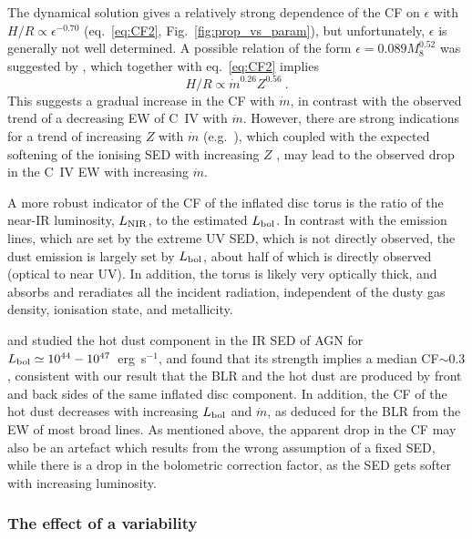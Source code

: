 \documentclass[a4paper,fleqn,usenatbib]{mnras}
\begin{document}
The dynamical solution gives a relatively strong dependence of the CF on $\epsilon$
with $H/R\propto \epsilon^{-0.70}$ (eq.~\ref{eq:CF2}, Fig.~\ref{fig:prop_vs_param}), but 
unfortunately, $\epsilon$ is generally not well determined. A possible relation of the form 
$\epsilon=0.089M_8^{0.52}$ was suggested by \citet{DavisLaor11}, which together with eq.~\ref{eq:CF2}
implies
\begin{equation}
H/R\propto \dot{m}^{0.26}Z^{0.56}\ .
\label{eq:cf_mdot}  
\end{equation}
This suggests a gradual increase in the CF with $\dot{m}$, in contrast with the observed trend of a
decreasing EW of C~IV with $\dot{m}$. However, there are strong indications for a trend of increasing $Z$
with $\dot{m}$ (e.g.\ \citealt{Shemmer04}), which coupled with the expected softening of the ionising
SED with increasing $Z$ \citep{LaorDavis14}, may lead to the observed drop in the C~IV EW with increasing
$\dot{m}$.

A more robust indicator of the CF of the inflated disc torus is the ratio of the near-IR
luminosity, $L_{\rm NIR}$, to the estimated $L_{\rm bol}$. In contrast with the emission lines, which 
are set by the extreme UV SED, which is not directly observed, the dust emission is largely set by
$L_{\rm bol}$, about half of which
is directly observed (optical to near UV). In addition,
the torus is likely very optically thick, and absorbs and reradiates all the incident radiation,
independent of the dusty gas density, ionisation state, and metallicity. 

\citet{Mor11} and \citet{Mor12} studied the hot dust component in the IR SED of AGN for
$L_{\rm bol}\simeq 10^{44}-10^{47}$~erg~s$^{-1}$, and found that its strength implies a median 
CF$\sim 0.3$, consistent with our result that the BLR and the hot dust are produced by
front and back sides of the same inflated disc component. In addition, the CF of the hot dust decreases
with increasing $L_{\rm bol}$ and $\dot{m}$, as deduced for the BLR from the EW of most broad lines. 
As mentioned above, the apparent drop in the CF may also be an artefact which results from the wrong 
assumption of a fixed SED, while there is a drop in the bolometric correction factor, as the SED gets softer
with increasing luminosity.
 



\subsubsection{The effect of a variability}
\end{document}
